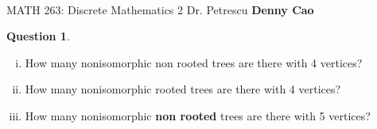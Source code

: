 \documentclass[article, 12pt]{article}
\title{\Huge\bf{\psetName}}
\author{\name}
\date{\dueDate}
\author{\name}
\date{\dueDate}
\makeatletter
\theoremstyle{definition}
\newcommand{\courseNumber}{MATH 263}
\newcommand{\courseName}{Discrete Mathematics 2}
\newcommand{\professor}{Dr. Petrescu}
\newcommand{\name}{Denny Cao}
\newtheorem{question}{Question}
\renewcommand{\maketitle}{\bgroup\setlength{\parindent}{0pt}
    \begin{flushleft}
        \textbf{\@title} \\ \vskip0.2cm
        \begingroup
            \fontsize{14pt}{12pt}\selectfont
            \courseNumber: \courseName 
            \vskip0.3cm 
            \professor
        \endgroup \vskip0.3cm
        \@date \hfill\rlap{}\bf{\name} \\ \vskip0.1cm
        \hrulefill
    \end{flushleft}\egroup 
}
\makeatother
\begin{document}
    \maketitle
    \thispagestyle{plain}

    \begin{question} \
        \label{q1}
        \begin{enumerate}[(i)]
            \item How many nonisomorphic non rooted trees are there with 4 vertices?
            \item How many nonisomorphic rooted trees are there with 4 vertices?
            \item How many nonisomorphic \textbf{non rooted} trees are there with 5 vertices?
        \end{enumerate}
    \end{question}
\end{document}
